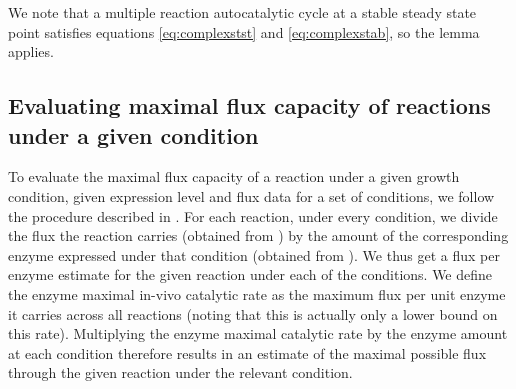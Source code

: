     We note that a multiple reaction autocatalytic cycle at a stable steady state point satisfies equations \ref{eq:complexstst} and \ref{eq:complexstab}, so the lemma applies.

    \subsection{Evaluating maximal flux capacity of reactions under a given condition}
    To evaluate the maximal flux capacity of a reaction under a given growth condition, given expression level and flux data for a set of conditions, we follow the procedure described in \cite{Davidi2016-ga}.
    For each reaction, under every condition, we divide the flux the reaction carries (obtained from \cite{Gerosa2015-oq}) by the amount of the corresponding enzyme expressed under that condition (obtained from \cite{Schmidt2015}).
    We thus get a flux per enzyme estimate for the given reaction under each of the conditions.
    We define the enzyme maximal in-vivo catalytic rate as the maximum flux per unit enzyme it carries across all reactions (noting that this is actually only a lower bound on this rate).
    Multiplying the enzyme maximal catalytic rate by the enzyme amount at each condition therefore results in an estimate of the maximal possible flux through the given reaction under the relevant condition.
